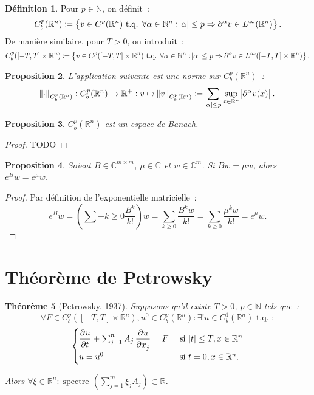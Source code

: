 \documentclass{report}
\DeclareMathOperator{\spectreOperator}{spectre\!}
\newcommand{\C}{{\mathbb C}}
\newcommand{\R}{{\mathbb R}}
\newcommand{\N}{{\mathbb N}}
\newcommand{\tq}{\text{ t.q. }}
\newcommand{\st}{\tq}
\newcommand{\pinfty}{{+\infty}}
\newcommand{\spectre}[1]{{\spectreOperator\left(#1\right)}}
\newtheorem{thm}{Théorème}[chapter]
\newtheorem{prp}[thm]{Proposition}
\theoremstyle{definition}
\newtheorem{déf}[thm]{Définition}
\theoremstyle{remark}
\begin{document}
\begin{déf} Pour $p \in \N$, on définit~:
\[C^p_b(\R^n) \coloneqq \left\{v \in C^p(\R^n) \st \forall \alpha \in \N^n : \abs \alpha \leq p \Rightarrow \partial^\alpha v \in L^\infty(\R^n)\right\}.\]
De manière similaire, pour $T > 0$, on introduit~:
\[C^p_b([-T, T] \times \R^n) \coloneqq \left\{v \in C^p([-T, T] \times \R^n) \st \forall \alpha \in \N^n : \abs \alpha \leq p \Rightarrow \partial^\alpha v \in L^\infty([-T, T] \times \R^n)\right\}.\]
\end{déf}

\begin{prp} L'application suivante est une norme sur $C^p_b(\R^n)$~:
\[\norm \cdot_{C^p_b(\R^n)} : C^p_b(\R^n) \to \R^+ : v \mapsto \norm v_{C^p_b(\R^n)} \coloneqq \sum_{\abs \alpha \leq p}\sup_{x \in \R^n}\abs {\partial^\alpha v(x)}.\]
\end{prp}

\begin{prp}\label{prp:C^p_b Banach} $C^p_b(\R^n)$ est un espace de Banach.
\end{prp}

\begin{proof}
TODO
\end{proof}

\begin{prp} Soient $B \in \C^{m \times m}$, $\mu \in \C$ et $w \in \C^m$. Si $Bw = \mu w$, alors $e^Bw = e^\mu w$.
\end{prp}

\begin{proof} Par définition de l'exponentielle matricielle~:
\[e^Bw = \left(\sum-{k \geq 0}\frac {B^k}{k!}\right)w = \sum_{k \geq 0}\frac {B^kw}{k!} = \sum_{k \geq 0}\frac {\mu^kw}{k!} = e^\mu w.\]
\end{proof}

\section{Théorème de Petrowsky}
\begin{thm}[Petrowsky, 1937] Supposons qu'il existe $T > 0$, $p \in \N$ tels que~:
\[\forall F \in C^p_b([-T, T] \times \R^n), u^0 \in C^p_b(\R^n) : \exists! u \in C^1_b(\R^n) \st:\]
\[\begin{cases}\dpd ut + \sum_{j=1}^nA_j\dpd u{x_j} = F & \text{ si } \abs t \leq T, x \in \R^n\\u=u^0 &\text{ si }t=0, x \in \R^n.\end{cases}\]

Alors $\forall \xi \in \R^n : \spectre {\sum_{j=1}^m\xi_j A_j} \subset \R$.
\end{thm}
\end{document}
